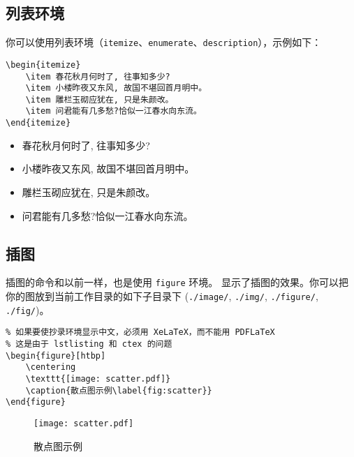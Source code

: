 \documentclass[lang=cn]{elegantpaper}
\begin{document}
\subsection{列表环境}
你可以使用列表环境（\lstinline{itemize}、\lstinline{enumerate}、\lstinline{description}），示例如下：\\[2ex]
\begin{minipage}[c]{0.51\linewidth}
\begin{lstlisting}
\begin{itemize}
	\item 春花秋月何时了, 往事知多少?
	\item 小楼昨夜又东风, 故国不堪回首月明中。
	\item 雕栏玉砌应犹在, 只是朱颜改。
	\item 问君能有几多愁?恰似一江春水向东流。
\end{itemize}
\end{lstlisting}
\end{minipage}
\begin{minipage}[c]{0.48\linewidth}
\begin{itemize}
	\item 春花秋月何时了, 往事知多少?
	\item 小楼昨夜又东风, 故国不堪回首月明中。
	\item 雕栏玉砌应犹在, 只是朱颜改。
	\item 问君能有几多愁?恰似一江春水向东流。
\end{itemize}
\end{minipage}




\subsection{插图}
插图的命令和以前一样，也是使用 \lstinline{figure} 环境。 显示了插图的效果。你可以把你的图放到当前工作目录的如下子目录下 (\lstinline{./image/}, \lstinline{./img/}, \lstinline{./figure/}, \lstinline{./fig/})。

\begin{lstlisting}
% 如果要使抄录环境显示中文，必须用 XeLaTeX，而不能用 PDFLaTeX
% 这是由于 lstlisting 和 ctex 的问题
\begin{figure}[htbp]
	\centering
	\texttt{[image: scatter.pdf]}
	\caption{散点图示例\label{fig:scatter}}
\end{figure}
\end{lstlisting}

\begin{figure}[htbp]
	\centering
	\texttt{[image: scatter.pdf]}
	\caption{散点图示例\label{fig:scatter}}
\end{figure}
\end{document}

